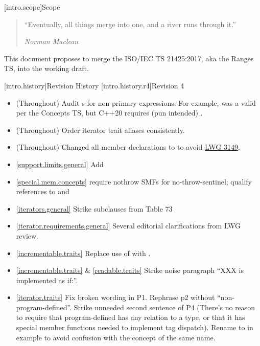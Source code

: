 [intro.scope]{Scope}

\begin{quote}
``Eventually, all things merge into one, and a river runs through it.''
\begin{flushright}
\textemdash \textit{Norman Maclean}
\end{flushright}
\end{quote}

\pnum
This document proposes to merge the ISO/IEC TS 21425:2017, aka the Ranges TS,
into the working draft.

[intro.history]{Revision History}
[intro.history.r4]{Revision 4}
\begin{itemize}
\item (Throughout) Audit s for
  non-primary-expressions. For example,  was a valid
   per the Concepts TS, but C++20 requires
  (pun intended) .
\item (Throughout) Order iterator trait aliases consistently.
\item (Throughout) Changed all  member declarations to
   to avoid \href{https://wg21.link/LWG3149}{LWG 3149}.
\item \ref{support.limits.general} Add 
\item \ref{special.mem.concepts} require nothrow SMFs for no-throw-sentinel;
  qualify references to  and 
\item \ref{iterators.general} Strike subclauses from Table 73
\item \ref{iterator.requirements.general} Several editorial clarifications from
  LWG review.
\item \ref{incrementable.traits} Replace use of  with
  .
\item \ref{incrementable.traits} \& \ref{readable.traits} Strike noise paragraph
  ``XXX is implemented as if:''.
\item \ref{iterator.traits} Fix broken wording in P1. Rephrase p2 without
  ``non-program-defined''. Strike unneeded second sentence of P4
  (There's no reason to require that program-defined 
  has any relation to a  type, or that it has special member
  functions needed to implement tag dispatch). Rename 
  to  in example to avoid confusion with the concept of the same name.

\end{itemize}

